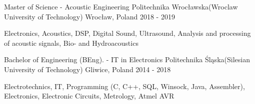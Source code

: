 

\begin{cventries}

  \cventry
    {Master of Science - Acoustic Engineering} %
    {Politechnika Wrocławska(Wroclaw University of Technology)} %
    {Wrocław, Poland} %
    {2018 - 2019} %
    {
      \begin{cvitems} %
        \item {Electronics, Acoustics, DSP, Digital Sound, Ultrasound, Analysis and processing of acoustic signals, Bio- and Hydroacoustics}
      \end{cvitems}
    }

    \cventry
    {Bachelor of Engineering (BEng). - IT in Electronics} %
    {Politechnika Śląska(Silesian University of Technology)} %
    {Gliwice, Poland} %
    {2014 - 2018} %
    {
      \begin{cvitems} %
        \item {Electrotechnics, IT, Programming (C, C++, SQL, Winsock, Java, Assembler), Electronics, Electronic Circuits, Metrology, Atmel AVR}
      \end{cvitems}
    }

\end{cventries}
